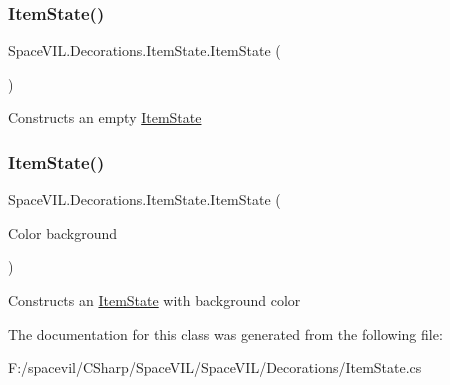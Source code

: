 \subsubsection{\texorpdfstring{Item\+State()}{ItemState()}\hspace{0.1cm}{\footnotesize\ttfamily [1/2]}}
{\footnotesize\ttfamily Space\+V\+I\+L.\+Decorations.\+Item\+State.\+Item\+State (\begin{DoxyParamCaption}{ }\end{DoxyParamCaption})\hspace{0.3cm}{\ttfamily [inline]}}



Constructs an empty \mbox{\hyperlink{class_space_v_i_l_1_1_decorations_1_1_item_state}{Item\+State}} 

\mbox{\label{class_space_v_i_l_1_1_decorations_1_1_item_state_a9fc55f09c2eca01e8e465502683d8a1c}} 
\subsubsection{\texorpdfstring{Item\+State()}{ItemState()}\hspace{0.1cm}{\footnotesize\ttfamily [2/2]}}
{\footnotesize\ttfamily Space\+V\+I\+L.\+Decorations.\+Item\+State.\+Item\+State (\begin{DoxyParamCaption}\item[{Color}]{background }\end{DoxyParamCaption})\hspace{0.3cm}{\ttfamily [inline]}}



Constructs an \mbox{\hyperlink{class_space_v_i_l_1_1_decorations_1_1_item_state}{Item\+State}} with background color 



The documentation for this class was generated from the following file\+:\begin{DoxyCompactItemize}
\item 
F\+:/spacevil/\+C\+Sharp/\+Space\+V\+I\+L/\+Space\+V\+I\+L/\+Decorations/Item\+State.\+cs\end{DoxyCompactItemize}
